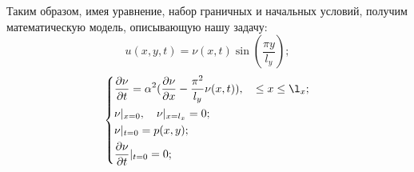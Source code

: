 {    
   Таким образом, имея уравнение, набор граничных и начальных условий, получим математическую модель, описывающую нашу задачу:
   		\begin{equation}
   		    u(x,y,t) = \nu(x,t)\sin (\dfrac{\pi y}{l_y});
   		\end{equation}
        \begin{equation}\label{eq15}
            \left\{
			\begin{split}
			& \dfrac{\partial \nu}{\partial t} = \alpha^2(\dfrac{\partial \nu}{\partial x}
        - \dfrac{\pi^2}{l_y}\nu(x, t)), \quad \le x \le \l_x; \\
			 &\nu|_{x=0}, \quad  
    \nu|_{x=l_x} = 0;\\
            &  \nu|_{t=0} = p(x,y);\\        
        	& \dfrac{\partial \nu}{\partial t}|_{t=0} = 0;
			\end{split}
			\right.
        \end{equation}
}
\newpage

